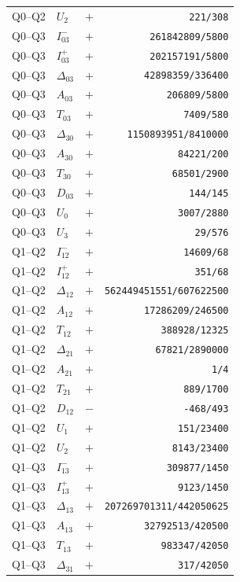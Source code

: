 \documentclass[11pt]{article}
\theoremstyle{plain}
\theoremstyle{definition}
\theoremstyle{remark}
\newcommand{\1}{\mathbf 1}
\begin{document}
\begin{longtable}{@{}llcr@{}}
Q0--Q2 & $U_{2}$ & $+$ & \texttt{221/308} \\
\addlinespace
Q0--Q3 & $I^-_{03}$ & $+$ & \texttt{261842809/5800} \\
Q0--Q3 & $I^+_{03}$ & $+$ & \texttt{202157191/5800} \\
Q0--Q3 & $\Delta_{03}$ & $+$ & \texttt{42898359/336400} \\
Q0--Q3 & $A_{03}$ & $+$ & \texttt{206809/5800} \\
Q0--Q3 & $T_{03}$ & $+$ & \texttt{7409/580} \\
Q0--Q3 & $\Delta_{30}$ & $+$ & \texttt{1150893951/8410000} \\
Q0--Q3 & $A_{30}$ & $+$ & \texttt{84221/200} \\
Q0--Q3 & $T_{30}$ & $+$ & \texttt{68501/2900} \\
Q0--Q3 & $D_{03}$ & $+$ & \texttt{144/145} \\
Q0--Q3 & $U_{0}$ & $+$ & \texttt{3007/2880} \\
Q0--Q3 & $U_{3}$ & $+$ & \texttt{29/576} \\
\addlinespace
Q1--Q2 & $I^-_{12}$ & $+$ & \texttt{14609/68} \\
Q1--Q2 & $I^+_{12}$ & $+$ & \texttt{351/68} \\
Q1--Q2 & $\Delta_{12}$ & $+$ & \texttt{562449451551/607622500} \\
Q1--Q2 & $A_{12}$ & $+$ & \texttt{17286209/246500} \\
Q1--Q2 & $T_{12}$ & $+$ & \texttt{388928/12325} \\
Q1--Q2 & $\Delta_{21}$ & $+$ & \texttt{67821/2890000} \\
Q1--Q2 & $A_{21}$ & $+$ & \texttt{1/4} \\
Q1--Q2 & $T_{21}$ & $+$ & \texttt{889/1700} \\
Q1--Q2 & $D_{12}$ & $-$ & \texttt{-468/493} \\
Q1--Q2 & $U_{1}$ & $+$ & \texttt{151/23400} \\
Q1--Q2 & $U_{2}$ & $+$ & \texttt{8143/23400} \\
\addlinespace
Q1--Q3 & $I^-_{13}$ & $+$ & \texttt{309877/1450} \\
Q1--Q3 & $I^+_{13}$ & $+$ & \texttt{9123/1450} \\
Q1--Q3 & $\Delta_{13}$ & $+$ & \texttt{207269701311/442050625} \\
Q1--Q3 & $A_{13}$ & $+$ & \texttt{32792513/420500} \\
Q1--Q3 & $T_{13}$ & $+$ & \texttt{983347/42050} \\
Q1--Q3 & $\Delta_{31}$ & $+$ & \texttt{317/42050} \\

\end{longtable}
\end{document}
